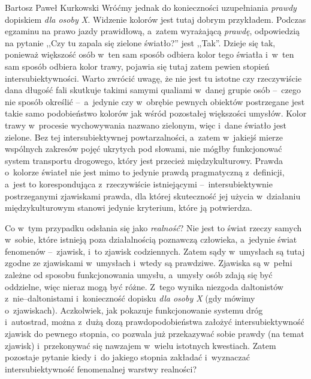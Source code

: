\begin{artplenv}{Bartosz Paweł Kurkowski}
Wróćmy jednak do konieczności uzupełniania \textit{prawdy} dopiskiem \textit{dla osoby X.} Widzenie kolorów jest tutaj
dobrym przykładem. Podczas egzaminu na prawo jazdy prawidłową, a~zatem wyrażającą \textit{prawdę}, odpowiedzią na
pytanie ,,Czy tu zapala się zielone światło?'' jest ,,Tak''. Dzieje się tak, ponieważ większość osób w~ten sam sposób
odbiera kolor tego światła i~w~ten sam sposób odbiera kolor trawy, pojawia się tutaj zatem pewien stopień
intersubiektywności. Warto zwrócić uwagę, że nie jest tu istotne czy rzeczywiście dana długość fali skutkuje takimi
samymi qualiami w~danej grupie osób --~czego nie sposób określić --~a~jedynie czy w~obrębie pewnych obiektów postrzegane
jest takie samo podobieństwo kolorów jak wśród pozostałej większości umysłów. Kolor trawy w~procesie wychowywania
nazwano zielonym, więc i~dane światło jest zielone. Bez tej intersubiektywnej powtarzalności, a~zatem w~jakiejś mierze
wspólnych zakresów pojęć ukrytych pod słowami, nie mógłby funkcjonować system transportu drogowego, który jest przecież
międzykulturowy. Prawda o~kolorze świateł nie jest mimo to jedynie prawdą pragmatyczną z~definicji, a~jest to
korespondująca z~rzeczywiście istniejącymi --~intersubiektywnie postrzeganymi zjawiskami prawda, dla której skuteczność
jej użycia w~działaniu międzykulturowym stanowi jedynie kryterium, które ją potwierdza.


Co w~tym przypadku odsłania się jako \textit{realność}? Nie jest to świat rzeczy samych w~sobie, które istnieją poza
działalnością poznawczą człowieka, a~jedynie świat fenomenów --~zjawisk, i~to zjawisk codziennych. Zatem sądy w~umysłach
są tutaj zgodne ze zjawiskami w~umysłach i~wtedy są prawdziwe. Zjawiska są w~pełni zależne od sposobu funkcjonowania
umysłu, a~umysły osób zdają się być oddzielne, więc nieraz mogą być różne. Z~tego wynika niezgoda
daltonistów z~nie–daltonistami i~konieczność dopisku \textit{dla osoby X} (gdy mówimy o~zjawiskach). Aczkolwiek, jak pokazuje
funkcjonowanie systemu dróg i~autostrad, można z~dużą dozą prawdopodobieństwa założyć intersubiektywność zjawisk do
pewnego stopnia, co pozwala już przekazywać sobie prawdy (na temat zjawisk) i~przekonywać się nawzajem w~wielu
istotnych kwestiach. Zatem pozostaje pytanie kiedy i~do jakiego stopnia zakładać i~wyznaczać intersubiektywność
fenomenalnej warstwy realności?



\end{artplenv}
